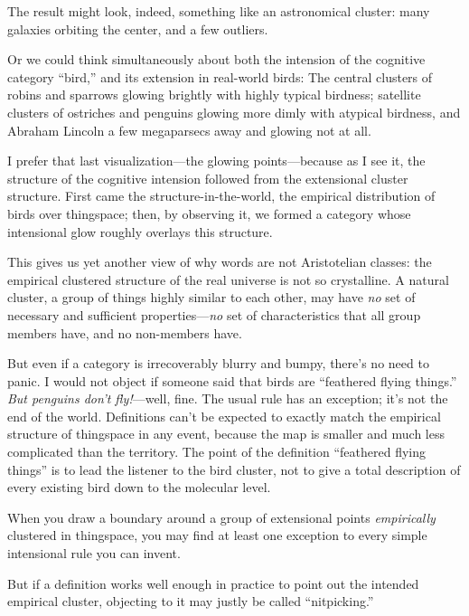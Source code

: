 {
 The result might look, indeed, something like an astronomical
cluster: many galaxies orbiting the center, and a few outliers.}

{
 Or we could think simultaneously about both the intension of the
cognitive category ``bird,'' and its
extension in real-world birds: The central clusters of robins and
sparrows glowing brightly with highly typical birdness; satellite
clusters of ostriches and penguins glowing more dimly with atypical
birdness, and Abraham Lincoln a few megaparsecs away and glowing not at
all.}

{
 I prefer that last visualization---the glowing points---because as
I see it, the structure of the cognitive intension followed from the
extensional cluster structure. First came the structure-in-the-world,
the empirical distribution of birds over thingspace; then, by observing
it, we formed a category whose intensional glow roughly overlays this
structure.}

{
 This gives us yet another view of why words are not Aristotelian
classes: the empirical clustered structure of the real universe is not
so crystalline. A natural cluster, a group of things highly similar to
each other, may have \textit{no} set of necessary and sufficient
properties---\textit{no} set of characteristics that all group members
have, and no non-members have.}

{
 But even if a category is irrecoverably blurry and bumpy,
there's no need to panic. I would not object if someone
said that birds are ``feathered flying
things.'' \textit{But penguins don't
fly!}{}---well, fine. The usual rule has an exception;
it's not the end of the world. Definitions
can't be expected to exactly match the empirical
structure of thingspace in any event, because the map is smaller and
much less complicated than the territory. The point of the definition
``feathered flying things'' is to
lead the listener to the bird cluster, not to give a total description
of every existing bird down to the molecular level.}

{
 When you draw a boundary around a group of extensional points
\textit{empirically} clustered in thingspace, you may find at least one
exception to every simple intensional rule you can invent.}

{
 But if a definition works well enough in practice to point out the
intended empirical cluster, objecting to it may justly be called
``nitpicking.''}

\myendsectiontext


